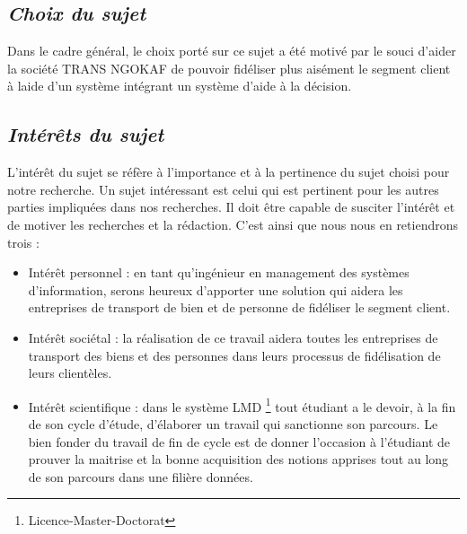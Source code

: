         \subsection[Choix du sujet]{\textit{Choix du sujet}}
        Dans le cadre général, le choix porté sur ce sujet a été motivé par le souci d’aider
        la société TRANS NGOKAF de pouvoir fidéliser plus aisément le segment client à laide d’un
        système intégrant un système d’aide à la décision.
        \subsection[Interet du sujet]{\textit{Intérêts du sujet}}
        L’intérêt du sujet se réfère à l’importance et à la pertinence du sujet choisi pour notre recherche.
        Un sujet intéressant est celui qui est pertinent pour les autres parties impliquées dans nos recherches.
        Il doit être capable de susciter l’intérêt et de motiver les recherches et la rédaction. C’est ainsi
        que nous nous en retiendrons trois :
         \newline 
            \begin{itemize}
                \item [\ding{226}] Intérêt personnel : en tant qu’ingénieur en management 
                des systèmes d’information, serons heureux d’apporter une solution
                qui aidera les entreprises de transport de bien et de personne de fidéliser
                le segment client.
                \newline

                \item [\ding{226}] Intérêt sociétal : la réalisation de ce travail aidera toutes les
                entreprises de transport des biens et des personnes dans leurs processus de
                fidélisation de leurs clientèles.
                \newline

                \item [\ding{226}] Intérêt scientifique : dans le système LMD \footnote[1]{Licence-Master-Doctorat} tout étudiant
                a le devoir, à la fin de son cycle d’étude, d’élaborer un travail qui
                sanctionne son parcours. Le bien fonder du travail de fin de cycle
                est de donner l’occasion à l’étudiant de prouver la maitrise et la bonne acquisition
                des notions apprises tout au long de son parcours dans une filière données.
            \end{itemize}
